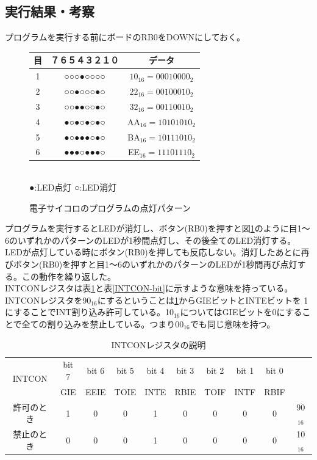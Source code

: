 \documentclass[a4paper,12pt]{ujarticle}
\begin{document}
  \subsection{実行結果・考察}
  プログラムを実行する前にボードのRB0をDOWNにしておく。
    \begin{figure}[htbp]
     \begin{center}
       \begin{tabular}{c|c|c}\hline
        目&７６５４３２１０ & データ \\ \hline
         1&○○○●○○○○ & $10_{16}=00010000_2$ \\
         2&○○●○○○●○ & $22_{16}=00100010_2$\\
         3&○○●●○○●○ & $32_{16}=00110010_2$\\
         4&●○●○●○●○ & AA$_{16}=10101010_2$\\
         5&●○●●●○●○ & BA$_{16}=10111010_2$\\
         6&●●●○●●●○ & EE$_{16}=11101110_2$\\ \hline
       \end{tabular}\\
      ●:LED点灯 ○:LED消灯
      \caption{電子サイコロのプログラムの点灯パターン}
      \label{fig:out_5-13}
     \end{center}
    \end{figure}

    プログラムを実行するとLEDが消灯し、ボタン(RB0)を押すと図\ref{fig:out_5-13}のように目1〜6のいずれかのパターンのLEDが1秒間点灯し、その後全てのLED消灯する。
    LEDが点灯している時にボタン(RB0)を押しても反応しない。消灯したあとに再びボタン(RB0)を押すと目1〜6のいずれかのパターンのLEDが1秒間再び点灯する。この動作を繰り返した。\\

    INTCONレジスタは表\ref{INTCON}と表\ref{INTCON-bit}に示すような意味を持っている。
    INTCONレジスタを90$_{16}$にするということは\ref{INTCON}からGIEビットとINTEビットを
    1にすることでINT割り込み許可している。10$_{16}$についてはGIEビットを0にすることで全ての割り込みを禁止している。つまり00$_{16}$でも同じ意味を持つ。

    \begin{table}[htbp]
     \begin{center}
      \caption{INTCONレジスタの説明}
      \label{INTCON}
      \begin{tabular}{|c|c|c|c|c|c|c|c|c|c|}\hline
       \multirow{2}{*}{INTCON} &bit 7&bit 6&bit 5&bit 4&bit 3&bit 2&bit 1&bit 0& \\ \cline{2-9}
       &GIE&EEIE&TOIE&INTE&RBIE&TOIF&INTF&RBIF& \\ \hline
       許可のとき&1&0&0&1&0&0&0&0&90$_{16}$ \\
       禁止のとき&0&0&0&1&0&0&0&0&10$_{16}$ \\ \hline
      \end{tabular}
     \end{center}
    \end{table}
\end{document}

